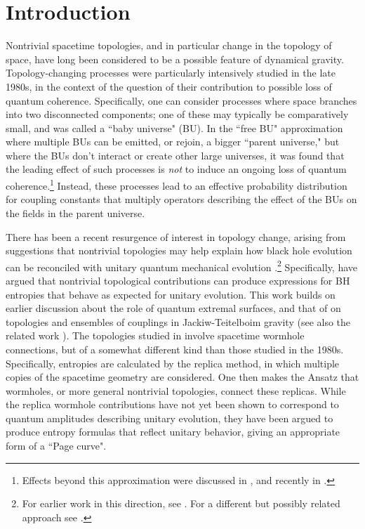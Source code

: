 \documentclass[11pt]{article}
\numberwithin{equation}{section}
\begin{document}
\section{Introduction}

Nontrivial spacetime topologies, and in particular change in the topology of space, have long been considered to be a possible feature of dynamical gravity.  Topology-changing processes were particularly intensively studied in the late 1980s, in the context of  the question of their contribution to possible loss of quantum coherence\cite{Lavrelashvili:1987jg,Hawking:1987mz,GiStAx,Cole,GiStInc}.  Specifically, one can consider processes where space branches into two disconnected components; one of these may typically be comparatively small, and was called a ``baby universe" (BU).  In the ``free BU" approximation where multiple BUs can be emitted, or rejoin, a bigger ``parent universe,"  but where the BUs don't interact or create other large universes, it was found that the leading effect of such processes is {\it not} to induce an ongoing loss of quantum coherence\cite{Cole,GiStInc}.\footnote{Effects beyond this approximation were discussed in \cite{GiSt3Q}, and recently in \cite{Marolf:2020xie}.}  Instead, these processes lead to an effective probability distribution for coupling constants that multiply operators describing the effect of the BUs on the fields in the parent universe.  

There has been a recent resurgence of interest in topology change, arising from suggestions that nontrivial topologies may help explain how black hole evolution can be reconciled with unitary quantum mechanical evolution \cite{Saad:2019lba, Penington:2019kki, Almheiri:2019qdq}.\footnote{For 
earlier work in this direction, see \cite{Polchinski:1994zs,AstroLH}.  For a different but possibly related approach see \cite{NVU,BHQU}.}  Specifically, \cite{Penington:2019kki, Almheiri:2019qdq} have argued that nontrivial topological contributions can produce expressions for BH entropies that behave as expected for unitary evolution\cite{Pageone,Page:1993wv}.  This work builds on earlier discussion\cite{Penington:2019npb, Almheiri:2019psf, Almheiri:2019hni} about the role of quantum extremal surfaces, and that of \cite{Saad:2019lba} on topologies and ensembles of couplings in Jackiw-Teitelboim gravity (see also the related work \cite{Maldacena:2019cbz, Cotler:2019nbi, Stanford:2019vob, Saad:2019pqd, Blommaert:2019wfy}).  The topologies studied in \cite{Almheiri:2019qdq, Penington:2019kki} involve spacetime wormhole connections, but of a somewhat different kind than those studied in the 1980s.  Specifically, entropies are calculated by the replica method\cite{CaWi}, in which multiple copies of the spacetime geometry are considered.  One then makes the Ansatz that wormholes, or more general nontrivial topologies, connect these replicas.  While the replica wormhole contributions have not yet been shown to correspond to quantum amplitudes describing unitary evolution, they have been argued to produce entropy formulas that reflect unitary behavior, giving an appropriate form of a ``Page curve"\cite{Pageone,Page:1993wv}.
\end{document}
